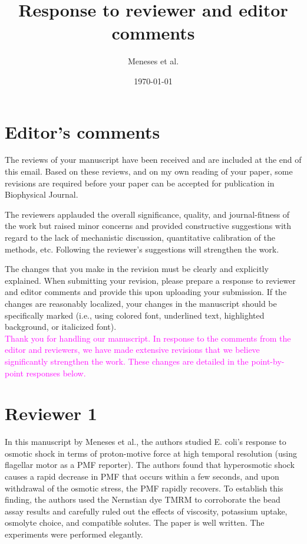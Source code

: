 \documentclass[11pt, letterpaper]{article}%
\title {Response to reviewer and editor comments}
\author{Meneses et al.}
\date{\today}
\newcommand{\response}{\textcolor{magenta}}
\begin{document}
\maketitle

\section*{Editor's comments}
The reviews of your manuscript have been received and are included at the end of this email. Based on these reviews, and on my own reading of your paper, some revisions are required before your paper can be accepted for publication in Biophysical Journal.

The reviewers applauded the overall significance, quality, and journal-fitness of the work but raised minor concerns and provided constructive suggestions with regard to the lack of mechanistic discussion, quantitative calibration of the methods, etc. Following the reviewer's suggestions will strengthen the work.

The changes that you make in the revision must be clearly and explicitly explained. When submitting your revision, please prepare a response to reviewer and editor comments and provide this upon uploading your submission. If the changes are reasonably localized, your changes in the manuscript should be specifically marked (i.e., using colored font, underlined text, highlighted background, or italicized font).\\

\noindent
\response{Thank you for handling our manuscript. In response to the comments from the editor and reviewers, we have made extensive revisions that we believe significantly strengthen the work. These changes are detailed in the point-by-point responses below.}


\section*{Reviewer 1} In this manuscript by Meneses et al., the authors studied E. coli's response to osmotic shock in terms of proton-motive force at high temporal resolution (using flagellar motor as a PMF reporter). The authors found that hyperosmotic shock causes a rapid decrease in PMF that occurs within a few seconds, and upon withdrawal of the osmotic stress, the PMF rapidly recovers. To establish this finding, the authors used the Nernstian dye TMRM to corroborate the bead assay results and carefully ruled out the effects of viscosity, potassium uptake, osmolyte choice, and compatible solutes. The paper is well written. The experiments were performed elegantly.\\
\end{document}

